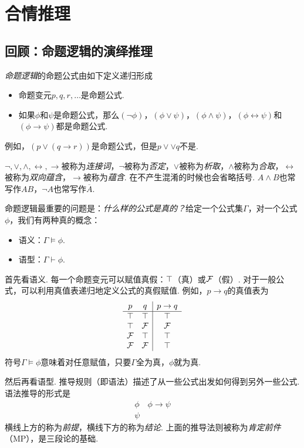\chapter{合情推理}\label{chap:plausible-reasoning}


\section{回顾：命题逻辑的演绎推理}

\emph{命题逻辑}的命题公式由如下定义递归形成
\begin{itemize}
    \item 命题变元$p,q,r,\dots$是命题公式.
    \item 如果$\phi$和$\psi$是命题公式，那么$(\neg\phi)$，$(\phi\vee\psi)$，$(\phi\wedge\psi)$，$(\phi\leftrightarrow\psi)$和$(\phi\to\psi)$都是命题公式.
\end{itemize}
例如，$(p\vee(q\to r))$是命题公式，但是$p\vee\vee q$不是. 

$\neg,\vee,\wedge,\leftrightarrow,\to$被称为\emph{连接词}，$\neg$被称为\emph{否定}，$\vee$被称为\emph{析取}，$\wedge$被称为\emph{合取}，$\leftrightarrow$被称为\emph{双向蕴含}，$\to$被称为\emph{蕴含}. 在不产生混淆的时候也会省略括号. $A\wedge B$也常写作$AB$，$\neg A$也常写作$\overline{A}$.

命题逻辑最重要的问题是：\emph{什么样的公式是真的？}给定一个公式集$\Gamma$，对一个公式$\phi$，我们有两种真的概念：
    \begin{itemize}
        \item 语义：$\Gamma\models \phi$.
        \item 语型：$\Gamma\vdash \phi$.
    \end{itemize}

首先看语义. 每一个命题变元可以赋值真假：$\top$（真）或$\mathcal{F}$（假）. 对于一般公式，可以利用真值表递归地定义公式的真假赋值. 例如，$p\to q$的真值表为
        \[\begin{array}{cc|c}
        p&q&p\to q\\\hline
             \top&\top&\top  \\
             \top&\mathcal{F}&\mathcal{F}  \\
             \mathcal{F}&\top&\top  \\
             \mathcal{F}&\mathcal{F}&\top  \\
        \end{array}\]
符号$\Gamma\models\phi$意味着对任意赋值，只要$\Gamma$全为真，$\phi$就为真.


然后再看语型. 推导规则（即语法）描述了从一些公式出发如何得到另外一些公式. 语法推导的形式是
    \[\begin{array}{c}
         \phi\quad\phi\to\psi  \\\hline
         \psi
    \end{array}\]
横线上方的称为\emph{前提}，横线下方的称为\emph{结论}. 上面的推导法则被称为\emph{肯定前件}（MP），是三段论的基础.

